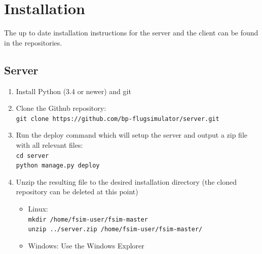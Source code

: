 \documentclass[accentcolor=tud1a, paper=a4, colorback]{tudreport}
\begin{document}
	\chapter{Installation}
	The up to date installation instructions for the server and the client can be found in the repositories.
	\section{Server}

	\begin{enumerate}
		\item Install Python (3.4 or newer) and git
		\item Clone the Github repository:\\ \texttt{git clone https://github.com/bp-flugsimulator/server.git}
		\item Run the deploy command which will setup the server and output a zip file with all relevant files:\\\texttt{cd server \\ python manage.py deploy}
		\item Unzip the resulting file to the desired installation directory (the cloned repository can be deleted at this point) 
		\begin{itemize}
			\item Linux:\\ \texttt{mkdir /home/fsim-user/fsim-master \\ unzip ../server.zip /home/fsim-user/fsim-master/}
			\item Windows: Use the Windows Explorer
		\end{itemize}
	\end{enumerate}
\end{document}
